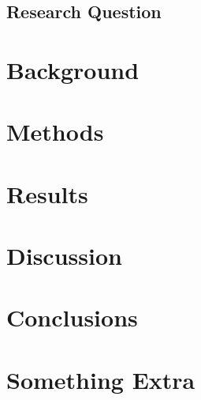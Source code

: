 \documentclass{kththesis}
\begin{document}
\Blindtext

\section{Research Question}
\blindtext

\chapter{Background}
\blindtext

\chapter{Methods}
\blindtext

\chapter{Results}
\blindtext

\chapter{Discussion}
\blindtext

\chapter{Conclusions}
\blindtext

\printbibliography[heading=bibintoc]

\appendix

\chapter{Something Extra}

\tailmatter
\end{document}
